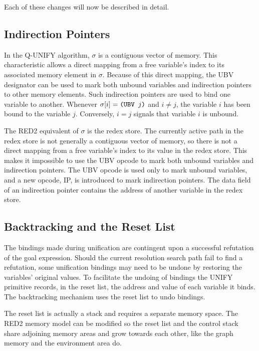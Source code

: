 Each of these changes will now be described in detail.

\subsection{Indirection Pointers}

In the Q-UNIFY algorithm, \(\sigma\) is a contiguous vector of memory. This
characteristic allows a direct mapping from a free variable's index to its
associated memory element in \(\sigma\). Because of this direct mapping, the UBV
designator can be used to mark both unbound variables and indirection pointers
to other memory elements. Such indirection pointers are used to bind one
variable to another. Whenever \(\sigma[i]=\texttt{(UBV }j\texttt{)}\) and
\(i\ne j\), the variable \(i\) has been bound to the variable \(j\). Conversely,
\(i=j\) signals that variable \(i\) is unbound.

The RED2 equivalent of \(\sigma\) is the redex store. The currently active path
in the redex store is not generally a contiguous vector of memory, so there is
not a direct mapping from a free variable's index to its value in the redex
store. This makes it impossible to use the UBV opcode to mark both unbound
variables and indirection pointers. The UBV opcode is used only to mark unbound
variables, and a new opcode, IP, is introduced to mark indirection pointers. The
data field of an indirection pointer contains the address of another variable
in the redex store.

\subsection{Backtracking and the Reset List}

The bindings made during unification are contingent upon a successful refutation
of the goal expression. Should the current resolution search path fail to find a
refutation, some unification bindings may need to be undone by restoring the
variables' original values. To facilitate the undoing of bindings the UNIFY
primitive records, in the reset list, the address and value of each variable it
binds. The backtracking mechanism uses the reset list to undo bindings.

The reset list is actually a stack and requires a separate memory space. The
RED2 memory model can be modified so the reset list and the control stack share
adjoining memory areas and grow towards each other, like the graph memory and
the environment area do.


